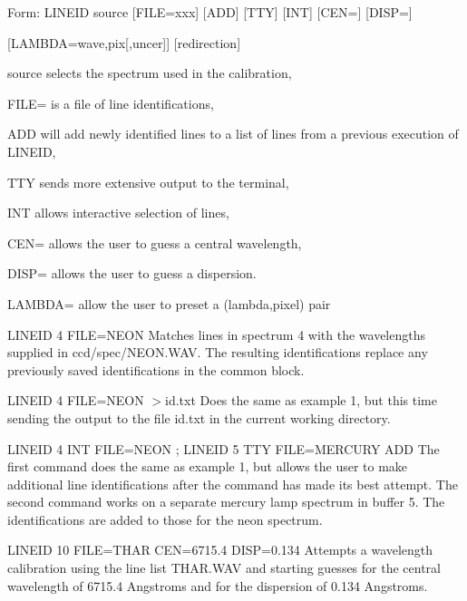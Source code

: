 {\newpage\clearpage
{}%
\begin{command}
  \item[Form: LINEID source {[FILE=xxx]} {[ADD]} {[TTY]} {[INT]} {[CEN=]} 
       {[DISP=]}\hfill]{}
  \item{{[LAMBDA=wave,pix{[,uncer]}]} {[redirection]}}
  \item[source]{selects the spectrum used in the calibration,}
  \item[FILE=]{is a file of line identifications,}
  \item[ADD]{will add newly identified lines to a list
       of lines from a previous execution of LINEID,}
  \item[TTY]{sends more extensive output to the terminal,}
  \item[INT]{allows interactive selection of lines,}
  \item[CEN=]{allows the user to guess a central wavelength,}
  \item[DISP=]{allows the user to guess a dispersion.}
  \item[LAMBDA=]{allow the user to preset a (lambda,pixel) pair}
\end{command}%
\lthtmlfigureZ
\lthtmlcheckvsize\clearpage}

{\newpage\clearpage
{}%
\begin{example}
  \item[LINEID 4 FILE=NEON\hfill]{Matches lines in spectrum 4 with the
       wavelengths supplied in ccd/spec/NEON.WAV.  The resulting
       identifications replace any previously saved identifications in the
       common block.}
\par
\item[LINEID 4 FILE=NEON $>$id.txt\hfill]{Does the same as example 1, but
       this time sending the output to the file id.txt in the current
       working directory.}
\par
\item[LINEID 4 INT FILE=NEON ; LINEID 5 TTY FILE=MERCURY ADD\hfill]{The
       first command does the same as example 1, but allows the user to
       make additional line identifications after the command has made its
       best attempt.  The second command works on a separate mercury lamp
       spectrum in buffer 5.  The identifications are added to those for
       the neon spectrum.}
\par
\item[LINEID 10 FILE=THAR CEN=6715.4 DISP=0.134\hfill]{Attempts a
       wavelength calibration using the line list THAR.WAV and starting
       guesses for the central wavelength of 6715.4 Angstroms and for the
       dispersion of 0.134 Angstroms.}
\end{example}%
\lthtmlfigureZ
\lthtmlcheckvsize\clearpage}

